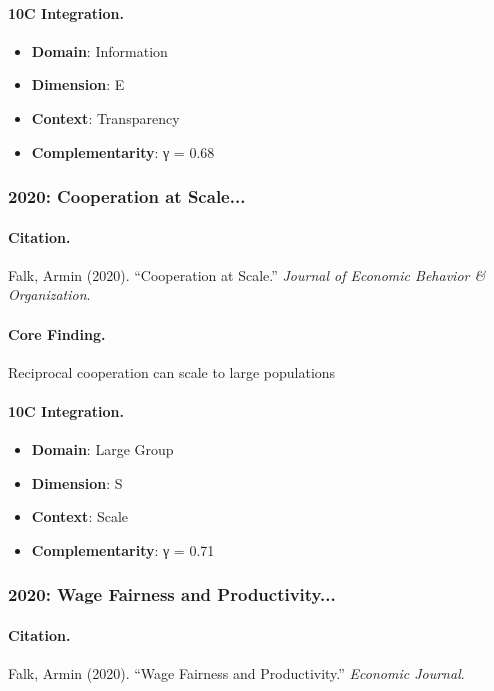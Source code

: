 \paragraph{10C Integration.}
\begin{itemize}[nosep]
  \item \textbf{Domain}: Information
  \item \textbf{Dimension}: E
  \item \textbf{Context}: Transparency
  \item \textbf{Complementarity}: γ = 0.68
\end{itemize}


\subsubsection{2020: Cooperation at Scale...}

\paragraph{Citation.}
Falk, Armin (2020). ``Cooperation at Scale.''
\textit{Journal of Economic Behavior & Organization}.

\paragraph{Core Finding.}
Reciprocal cooperation can scale to large populations

\paragraph{10C Integration.}
\begin{itemize}[nosep]
  \item \textbf{Domain}: Large Group
  \item \textbf{Dimension}: S
  \item \textbf{Context}: Scale
  \item \textbf{Complementarity}: γ = 0.71
\end{itemize}


\subsubsection{2020: Wage Fairness and Productivity...}

\paragraph{Citation.}
Falk, Armin (2020). ``Wage Fairness and Productivity.''
\textit{Economic Journal}.

